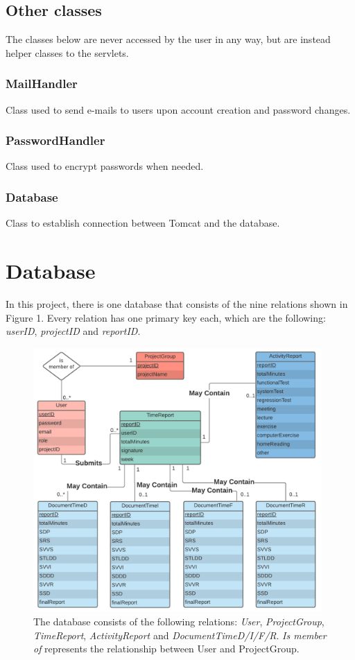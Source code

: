 \documentclass{article}
\begin{document}
\subsection{Other classes}
The classes below are never accessed by the user in any way, but are instead helper classes to the servlets.

\subsubsection{MailHandler}
Class used to send e-mails to users upon account creation and password changes.

\subsubsection{PasswordHandler}
Class used to encrypt passwords when needed.

\subsubsection{Database}
Class to establish connection between Tomcat and the database.

\section{Database}
In this project, there is one database that consists of the nine relations shown in Figure 1. Every relation has one primary key each, which are the following: \emph{userID}, \emph{projectID} and \emph{reportID}.

\begin{figure}[H]
     \centering
     \includegraphics[width=11cm]{images/PUSPERdiagramVers3_2.png}
     \renewcommand\figurename{Figure}
     \caption{The database consists of the following relations: \emph{User}, \emph{ProjectGroup}, \emph{TimeReport}, \emph{ActivityReport} and \emph{DocumentTimeD/I/F/R}. \emph{Is member of} represents the relationship between User and ProjectGroup.}
     \label{fig:my_label}
 \end{figure}
\end{document}
